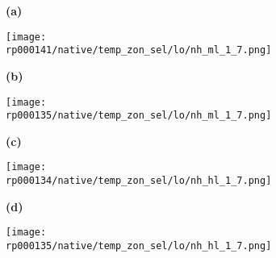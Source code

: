 \documentclass[preview]{standalone}
\begin{document}
\begin{figure}

  \begin{subfigure}[t]{0.05\textwidth}
    \textbf{\large{(a)}}
  \end{subfigure}
  \begin{subfigure}[t]{0.45\textwidth}
    \texttt{[image: rp000141/native/temp\_zon\_sel/lo/nh\_ml\_1\_7.png]}
  \end{subfigure}
  \begin{subfigure}[t]{0.05\textwidth}
    \textbf{\large{(b)}}
  \end{subfigure}
  \begin{subfigure}[t]{0.45\textwidth}
    \texttt{[image: rp000135/native/temp\_zon\_sel/lo/nh\_ml\_1\_7.png]}
  \end{subfigure}

  \begin{subfigure}[t]{0.05\textwidth}
    \textbf{\large{(c)}}
  \end{subfigure}
  \begin{subfigure}[t]{0.45\textwidth}
    \texttt{[image: rp000134/native/temp\_zon\_sel/lo/nh\_hl\_1\_7.png]}
  \end{subfigure}
  \begin{subfigure}[t]{0.05\textwidth}
    \textbf{\large{(d)}}
  \end{subfigure}
  \begin{subfigure}[t]{0.45\textwidth}
    \texttt{[image: rp000135/native/temp\_zon\_sel/lo/nh\_hl\_1\_7.png]}
  \end{subfigure}

\end{figure}
\end{document}
